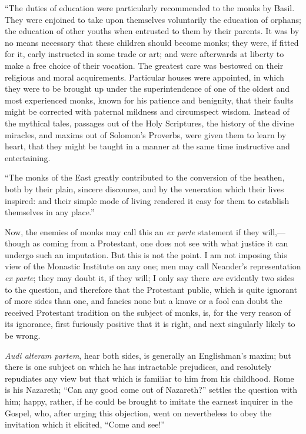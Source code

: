 ``The duties of education were particularly
recommended to the monks by Basil. They were enjoined to
take upon themselves voluntarily the education of
orphans; the education of other youths when entrusted to
them by their parents. It was by no means necessary that
these children should become monks; they were, if fitted
for it, early instructed in some trade or art; and were
afterwards at liberty to make a free choice of their
vocation. The greatest care was bestowed on their
religious and moral acquirements. Particular houses were
appointed, in which they were to be brought up under the
superintendence of one of the oldest and most experienced
monks, known for his patience and benignity, that their
faults might be corrected with paternal mildness and
circumspect wisdom. Instead of the mythical tales,
passages out of the Holy Scriptures, the history of the
divine miracles, and maxims out of Solomon's Proverbs,
were given them to learn by heart, that they might be
taught in a manner at the same time instructive and
entertaining.

``The monks of the East greatly contributed to the
conversion of the heathen, both by their plain, sincere
discourse, and by the veneration which their lives
inspired: and their simple mode of living rendered it
easy for them to establish themselves in any place.''

Now, the enemies of monks may call this an \emph{ex
parte} statement if they will,—though as coming
from a Protestant, one does not see with what justice it
can undergo such an imputation. But this is not the
point. I am not imposing this view of the Monastic
Institute on any one; men may call Neander's
representation \emph{ex parte}; they may doubt it, if
they will; I only say there \emph{are} evidently two
sides to the question, and therefore that the Protestant
public, which is quite ignorant of more sides than one,
and fancies none but a knave or a fool can doubt the
received Protestant tradition on the subject of monks,
is, for the very reason of its ignorance, first furiously
positive that it is right, and next singularly likely to
be wrong.

\emph{Audi alteram partem}, hear both sides, is
generally an Englishman's maxim; but there is one subject
on which he has intractable prejudices, and resolutely
repudiates any view but that which is familiar to him
from his childhood. Rome is his Nazareth; ``Can any
good come out of Nazareth?'' settles the question
with him; happy, rather, if he could be brought to
imitate the earnest inquirer in the Gospel, who, after
urging this objection, went on nevertheless to obey the
invitation which it elicited, ``Come and see!''

